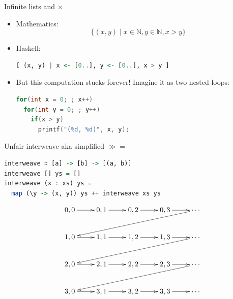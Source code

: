 \documentclass[handout]{beamer}
\def\N{\mathbb{N}}
\begin{document}
\begin{frame}[fragile]{Infinite lists and $\times$}
\begin{adjustwidth}{-1em}{-1em}

\begin{itemize}[<+->]

\item Mathematics:
$$ \{ (x, y) \mid x \in \N, y \in \N, x > y \} $$

\item Haskell:
\begin{lstlisting}[language=Haskell]
[ (x, y) | x <- [0..], y <- [0..], x > y ]
\end{lstlisting}

\item But this computation stucks forever! Imagine it as two nested loops:

\begin{lstlisting}[language=C]
for(int x = 0; ; x++)
  for(int y = 0; ; y++)
    if(x > y)
      printf("(%d, %d)", x, y);
\end{lstlisting}

\end{itemize}

\end{adjustwidth}
\end{frame}

\begin{frame}[fragile]{Unfair interweave aka simplified $\gg\!\!=$}

\begin{lstlisting}[language=Haskell]
interweave ∷ [a] -> [b] -> [(a, b)]
interweave [] ys = []
interweave (x : xs) ys =
  map (\y -> (x, y)) ys ++ interweave xs ys
\end{lstlisting}

$$\xymatrix{
0,0 \ar[r] & 0,1 \ar[r] & 0,2 \ar[r] & 0,3 \ar[r] & \cdots \ar[dllll] \\
1,0 \ar[r] & 1,1 \ar[r] & 1,2 \ar[r] & 1,3 \ar[r] & \cdots \ar[dllll] \\
2,0 \ar[r] & 2,1 \ar[r] & 2,2 \ar[r] & 2,3 \ar[r] & \cdots \ar[dllll] \\
3,0 \ar[r] & 3,1 \ar[r] & 3,2 \ar[r] & 3,3 \ar[r] & \cdots \\
}$$

\end{frame}
\end{document}
